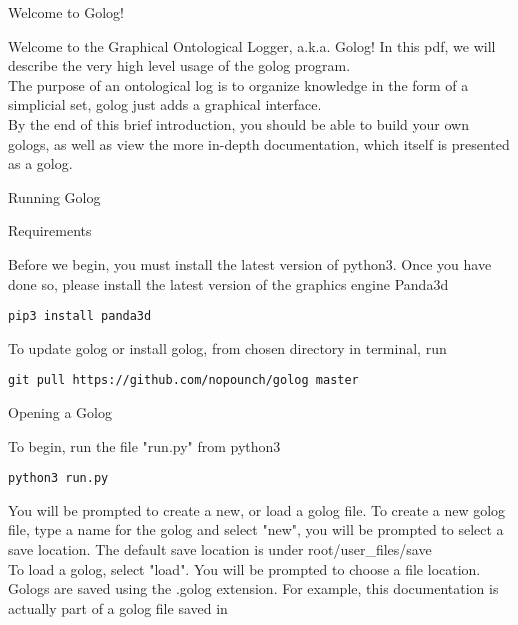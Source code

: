 \documentclass{article}
\begin{document}
\begin{section}{Welcome to Golog!}
\end{section}
Welcome to the Graphical Ontological Logger, a.k.a. Golog! In this pdf, we will describe the very high level usage of the golog program. \\

The purpose of an ontological log is to organize knowledge in the form of a simplicial set, golog just adds a graphical interface.\\

By the end of this brief introduction, you should be able to build your own gologs, as well as view the more in-depth documentation, which itself is presented as a golog.

\begin{section}{Running Golog}
\end{section}

\begin{subsection}{Requirements}
\end{subsection}

Before we begin, you must install the latest version of python3. Once you have done so, please install the latest version of the graphics engine Panda3d
\begin{lstlisting}
pip3 install panda3d
\end{lstlisting}

To update golog or install golog, from chosen directory in terminal, run
\begin{lstlisting}
git pull https://github.com/nopounch/golog master
\end{lstlisting}

\begin{subsection}{Opening a Golog}
\end{subsection}
To begin, run the file "run.py" from python3
\begin{lstlisting}
python3 run.py
\end{lstlisting}

You will be prompted to create a new, or load a golog file. 
To create a new golog file, type a name for the golog and select "new", you will be prompted to select a save location. The default save location is under root/user\_files/save\\

To load a golog, select "load". You will be prompted to choose a file location. Gologs are saved using the .golog extension. For example, this documentation is actually part of a golog file saved in 
\end{document}
